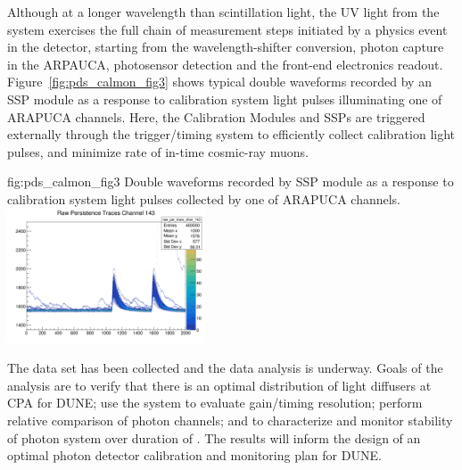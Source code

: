 Although at a longer wavelength than \lar scintillation light, the UV light from the system exercises the full chain of measurement steps initiated by a physics event in the detector, starting from the wavelength-shifter conversion, photon capture in the ARPAUCA, photosensor detection and the front-end electronics readout.
Figure~\ref{fig:pds_calmon_fig3} shows typical double waveforms recorded by an  SSP module as a response to calibration system
light pulses illuminating one of ARAPUCA channels. Here, the Calibration Modules and SSPs are triggered externally through the trigger/timing system to efficiently collect calibration light pulses, and minimize rate of in-time cosmic-ray muons.

 \begin{dunefigure}
 {fig:pds_calmon_fig3}
 {Double waveforms recorded by  SSP module as a response to calibration system light pulses collected by one of ARAPUCA channels.}
\includegraphics[height=4cm]{graphics/pds-calmon-example.png}
\end{dunefigure}

The  data set has been collected and the data analysis is underway.
Goals of the analysis are to verify that there is an optimal distribution of light diffusers at CPA for DUNE; use the system to evaluate gain/timing resolution;  perform relative comparison of photon channels;
and to characterize and monitor stability of photon system over duration of . The results will inform the design of an optimal
photon detector calibration and monitoring plan for DUNE.





